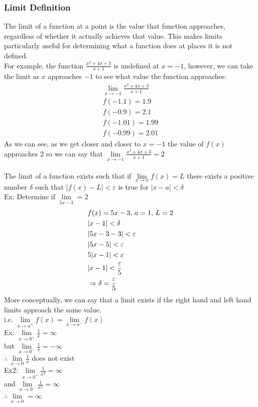 \documentclass[11pt, fleqn]{article}
\begin{document}
\subsubsection{Limit Definition}
The limit of a function at a point is the value that function approaches, regardless of whether it actually achieves that value. This makes limits particularly useful for determining what a function does at places it is not defined.\\
For example, the function $\frac{x^2+4x+3}{x+1}$ is undefined at $x=-1$, however, we can take the limit as $x$ approaches $-1$ to see what value the function approaches:
\begin{align*}
    \lim \limits_{x\to -1}\frac{x^2+4x+3}{x+1}\\
    f(-1.1)= 1.9\\
    f(-0.9)= 2.1\\
    f(-1.01)= 1.99\\
    f(-0.99)= 2.01
\end{align*}
As we can see, as we get closer and closer to $x=-1$ the value of $f(x)$ approaches $2$ so we can say that $\lim \limits_{x\to -1}\frac{x^2+4x+3}{x+1}=2$\\
\\
The limit of a function exists such that if $\lim\limits_{x\to a}f(x)=L$ there exists a positive number $\delta$ such that $|f(x)-L|<\varepsilon$ is true for $|x-a|<\delta$\\
Ex: Determine if $\lim\limits_{5x-3}=2$
\begin{align*}
    &f(x)=5x-3,\,a=1,\,L=2\\
    &|x-1|<\delta\\
    &|5x-3-3|<\varepsilon\\
    &|5x-5|<\varepsilon\\
    &5|x-1|<\varepsilon\\
    &|x-1|<\frac{\varepsilon}{5}\\
    &\Rightarrow\delta=\frac{\varepsilon}{5}
\end{align*}
More conceptually, we can say that a limit exists if the right hand and left hand limits approach the same value.\\
i.e. $\lim\limits_{x\to a^+}f(x)=\lim\limits_{x\to a^-}f(x)$\\
Ex: $\lim\limits_{x\to 0^+}\frac{1}{x}=\infty$\\
but $\lim\limits_{x\to 0^-}\frac{1}{x}=-\infty$\\
$\therefore\,\lim\limits_{x\to 0}\frac{1}{x}$ does not exist\\
Ex2: $\lim\limits_{x\to 0^+}\frac{1}{x^2}=\infty$\\
and $\lim\limits_{x\to 0^-}\frac{1}{x^2}=\infty$\\
$\therefore\,\lim\limits_{x\to 0}=\infty$
\end{document}
